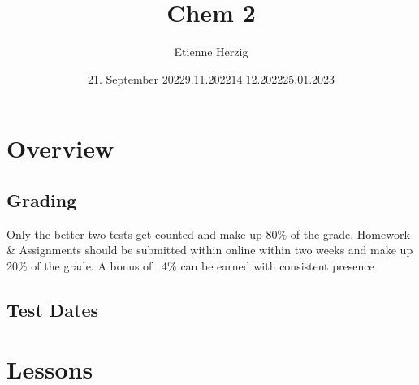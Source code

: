 \documentclass{article}
\title{Chem 2}
\author{Etienne Herzig}
\date{21. September 2022}
\begin{document}
\setlength{\textheight}{680pt}

\maketitle
\clearpage
\section{Overview}
\subsection{Grading}
Only the better two tests get counted and make up 80\% of the grade.
Homework \& Assignments should be submitted within online within two weeks and make up 20\% of the grade.
A bonus of ~4\% can be earned with consistent presence
\subsection{Test Dates}
\date{9.11.2022}\hfill\break
\date{14.12.2022}\hfill\break
\date{25.01.2023}\hfill\break
\clearpage
\section{Lessons}
\end{document}
